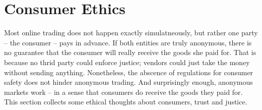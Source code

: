 \section{Consumer Ethics}
\label{consumers}

Most online trading does not happen exactly simulatneously, but rather one party -- the consumer -- pays in advance. If both entities are truly anonymous, there is no guarantee that the consumer will really receive the goods she paid for. That is because no thrid party could enforce justice; vendors could just take the money without sending anything. Nonetheless, the abscence of regulations for consumer safety does not hinder anonymous trading. And surprisingly enough, anonymous markets work -- in a sense that consumers do receive the goods they paid for\cite{silkroad2013}. This section collects some ethical thoughts about consumers, trust and justice. 



% 
% 
% 
% 
% 
